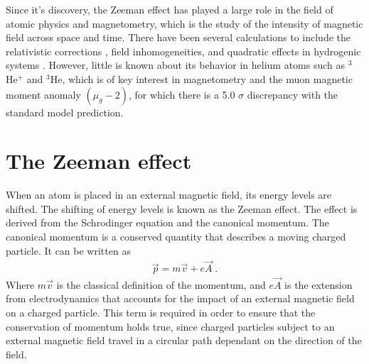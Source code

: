         Since it's discovery, the Zeeman effect has played a large role in the field of atomic physics and magnetometry, which is the study of the intensity of magnetic field across space and time. There have been several calculations to include the relativistic corrections \cite{2007Drake-Wu, Drake-Yan}, field inhomogeneities, and quadratic effects in hydrogenic systems \cite{Fontanari_Sadovskií_2015}. However, little is known about its behavior in helium atoms such as $^3$He$^+$ and $^3$He, which is of key interest in magnetometry and the muon magnetic moment anomaly $(\mu_g - 2)$, for which there is a 5.0 $\sigma$ discrepancy \cite{aguillard2023measurement} with the standard model prediction.

    \section{The Zeeman effect}\label{sec:quadratic_zeeman}
        When an atom is placed in an external magnetic field, its energy levels are shifted. The shifting of energy levels is known as the Zeeman effect. The effect is derived from the Schrodinger equation and the canonical momentum. The canonical momentum is a conserved quantity that describes a moving charged particle. It can be written as 
        \begin{align}
            \vec{p} = m\vec{v} + e\vec{A}\;.
        \end{align}
        \noindent Where $m\vec{v}$ is the classical definition of the momentum, and $e\vec{A}$ is the extension from electrodynamics that accounts for the impact of an external magnetic field on a charged particle. This term is required in order to ensure that the conservation of momentum holds true, since charged particles subject to an external magnetic field travel in a circular path dependant on the direction of the field.\\
        
